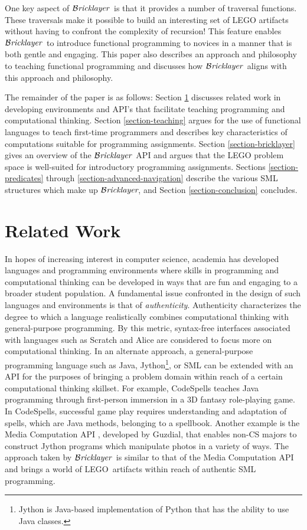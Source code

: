 \documentclass[submission,copyright,creativecommons]{eptcs}
\newcommand{\bricklayer}{\ensuremath{\mathcal{B}\emph{ricklayer}}}
\begin{document}
One key aspect of \bricklayer\ is that it provides a number of traversal functions. These traversals make it possible to build an interesting set of LEGO artifacts without having to confront the complexity of recursion! This feature enables \bricklayer\ to introduce functional programming to novices in a manner that is both gentle and engaging. This paper also describes an approach and philosophy to teaching functional programming and discusses how \bricklayer\ aligns with this approach and philosophy.

The remainder of the paper is as follows: Section \ref{section-related-work} discusses related work in developing environments and API's that facilitate teaching programming and computational thinking. Section \ref{section-teaching} argues for the use of functional languages to teach first-time programmers and describes key characteristics of computations suitable for programming assignments. Section \ref{section-bricklayer} gives an overview of the \bricklayer\ API and argues that the LEGO problem space is well-suited for introductory programming assignments. Sections \ref{section-predicates} through \ref{section-advanced-navigation} describe the various SML structures which make up \bricklayer, and Section \ref{section-conclusion} concludes.

\section{Related Work}\label{section-related-work}



In hopes of increasing interest in computer science, academia has developed languages and programming environments where skills in programming and computational thinking can be developed in ways that are fun and engaging to a broader student population. A fundamental issue confronted in the design of such languages and environments is that of \emph{authenticity}. Authenticity characterizes the degree to which a language realistically combines computational thinking with general-purpose programming. By this metric, syntax-free interfaces associated with languages such as Scratch \cite{Maloney:2010:Scratch} and Alice \cite{Dann:2006:ALICE} are considered to focus more on computational thinking. In an alternate approach, a general-purpose programming language such as Java, Jython\footnote{Jython is Java-based implementation of Python that has the ability to use Java classes.}, or SML can be extended with an API for the purposes of bringing a problem domain within reach of a certain computational thinking skillset. For example, CodeSpells \cite{Esper:2013:CodeSpells} teaches Java programming through first-person immersion in a 3D fantasy role-playing game. In CodeSpells, successful game play requires understanding and adaptation of spells, which are Java methods, belonging to a spellbook. Another example is the Media Computation API \cite{Guzdial:2003:Media-Computation-ITiCSE}, developed by Guzdial, that enables non-CS majors to construct Jython programs which manipulate photos in a variety of ways. The approach taken by \bricklayer\ is similar to that of the Media Computation API and brings a world of LEGO\textregistered\ artifacts within reach of authentic SML programming.
\end{document}
